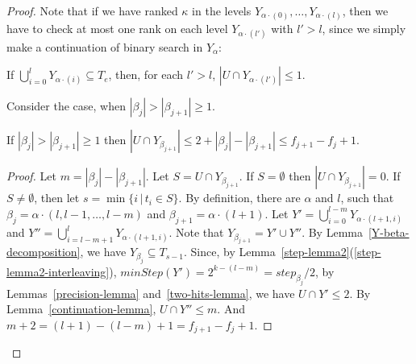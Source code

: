 \documentclass{llncs}
\begin{document}
\begin{proof}

Note that if we have ranked $\kappa$ in %
the levels
$Y_{\alpha\cdot(0)},\ldots, Y_{\alpha\cdot(l)}$, then
we have to check at most one rank on each level $Y_{\alpha\cdot(l')}$ with $l'>l$,
since we simply make a continuation of binary search in $Y_\alpha$:
\begin{lemma}\label{continuation-lemma}
If $\bigcup_{i=0}^l Y_{\alpha\cdot(i)}\subseteq T_e$, then,
for each $l'>l$,
$|U\cap Y_{\alpha\cdot(l')}|\le 1$.
\end{lemma}


Consider the case, when $|\beta_j|>|\beta_{j+1}|\ge 1$.
\begin{lemma}\label{recursion-back-lemma}
If $|\beta_{j}|>|\beta_{j+1}|\ge 1$ 
then 
$|U \cap Y_{\beta_{j+1}}|
\le 
2+|\beta_{j}|-|\beta_{j+1}|
\le
f_{j+1}-f_j+1$.
\end{lemma}

\begin{proof}
Let $m=|\beta_{j}|-|\beta_{j+1}|$.
Let  $S=U\cap Y_{\beta_{j+1}}$.
If $S=\emptyset$ then $|U\cap Y_{\beta_{j+1}}|=0$.
If $S\not=\emptyset$, then let $s=\min\{i\,|\, t_i\in S\}$.
By definition, there are $\alpha$ and $l$, such that
$\beta_j=\alpha\cdot (l,l-1,\ldots, l-m)$ and
$\beta_{j+1}=\alpha\cdot (l+1)$.
Let $Y'=\bigcup_{i=0}^{l-m} Y_{\alpha\cdot(l+1,i)}$ and
$Y''=\bigcup_{i=l-m+1}^l Y_{\alpha\cdot(l+1,i)}$.
Note that $Y_{\beta_{j+1}}=Y'\cup Y''$.
By Lemma~\ref{Y-beta-decomposition}, we have $Y_{\beta_j}\subseteq T_{s-1}$.
Since,
by Lemma~\ref{step-lemma2}(\ref{step-lemma2-interleaving}),
$minStep(Y')=2^{k-(l-m)}=step_{\beta_j}/2$, by Lemmas~\ref{precision-lemma} and~\ref{two-hits-lemma},
we have 
$U\cap Y'\le 2$.
By Lemma~\ref{continuation-lemma}, 
$U\cap Y''\le m$.
And $m+2=(l+1)-(l-m)+1=f_{j+1}-f_j+1$.
\end{proof}



\end{proof}
\end{document}
